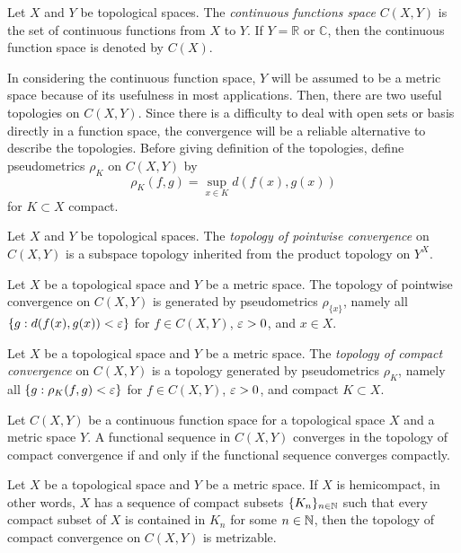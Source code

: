\documentclass{../crs}
\begin{document}
\begin{defn}
Let $X$ and $Y$ be topological spaces.
The \emph{continuous functions space} $C(X,Y)$ is the set of continuous functions from $X$ to $Y$.
If $Y=\mathbb{R}$ or $\mathbb{C}$, then the continuous function space is denoted by $C(X)$.
\end{defn}

In considering the continuous function space, $Y$ will be assumed to be a metric space because of its usefulness in most applications.
Then, there are two useful topologies on $C(X,Y)$.
Since there is a difficulty to deal with open sets or basis directly in a function space, the convergence will be a reliable alternative to describe the topologies.
Before giving definition of the topologies, define pseudometrics $\rho_K$ on $C(X,Y)$ by
\[\rho_K(f,g)=\sup_{x\in K}d(f(x),g(x))\]
for $K\subset X$ compact.

\begin{defn}
Let $X$ and $Y$ be topological spaces.
The \emph{topology of pointwise convergence} on $C(X,Y)$ is a subspace topology inherited from the product topology on $Y^X$.
\end{defn}

\begin{prop}
Let $X$ be a topological space and $Y$ be a metric space.
The topology of pointwise convergence on $C(X,Y)$ is generated by pseudometrics $\rho_{\{x\}}$, namely all $\{g:d(f(x),g(x))<\varepsilon\}$ for $f\in C(X,Y)$, $\varepsilon>0$, and $x\in X$.
\end{prop}

\begin{defn}
Let $X$ be a topological space and $Y$ be a metric space.
The \emph{topology of compact convergence} on $C(X,Y)$ is a topology generated by pseudometrics $\rho_K$, namely all $\{g:\rho_K(f,g)<\varepsilon\}$ for $f\in C(X,Y)$, $\varepsilon>0$, and compact $K\subset X$.
\end{defn}

\begin{prop}
Let $C(X,Y)$ be a continuous function space for a topological space $X$ and a metric space $Y$.
A functional sequence in $C(X,Y)$ converges in the topology of compact convergence if and only if the functional sequence converges compactly.
\end{prop}

\begin{thm}
Let $X$ be a topological space and $Y$ be a metric space.
If $X$ is hemicompact, in other words, $X$ has a sequence of compact subsets $\{K_n\}_{n\in\mathbb{N}}$ such that every compact subset of $X$ is contained in $K_n$ for some $n\in\mathbb{N}$, then the topology of compact convergence on $C(X,Y)$ is metrizable.
\end{thm}
\end{document}
